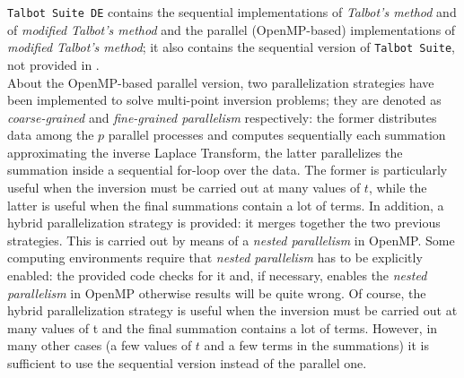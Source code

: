 \documentclass[a4paper,10pt]{report}%
\begin{document}
{\tt Talbot Suite DE} contains the sequential implementations of {\em Talbot's method} and of
{\em modified Talbot's method} and the parallel (OpenMP-based) implementations of {\em modified Talbot's
method}; it also contains the sequential version of {\tt Talbot Suite}, not provided in \cite{TALBOT_SUITE:2014}.
\\
About the OpenMP-based parallel version, two parallelization strategies have been implemented to solve
multi-point inversion problems; they are denoted as {\em coarse-grained} and {\em fine-grained
parallelism} respectively: the former distributes data among the $p$ parallel processes and computes
sequentially each summation approximating the inverse Laplace Transform, the latter parallelizes the
summation inside a sequential for-loop over the data.
The former is particularly useful when the inversion must be carried out at many values of $t$, while
the latter is useful when the final summations contain a lot of terms. In addition, a hybrid
parallelization strategy is provided: it merges together the two previous strategies. This is carried
out by means of a {\em nested parallelism} in OpenMP.
Some computing environments require that {\em nested parallelism} has to be explicitly enabled: the
provided code checks for it and, if necessary, enables the {\em nested parallelism} in OpenMP otherwise
results will be quite wrong.
Of course, the hybrid parallelization strategy is useful when the inversion must be carried out at many
values of t and the final summation contains a lot of terms. However, in many other cases (a few values
of $t$ and a few terms in the summations) it is sufficient to use the sequential version instead of the
parallel one.
\end{document}
